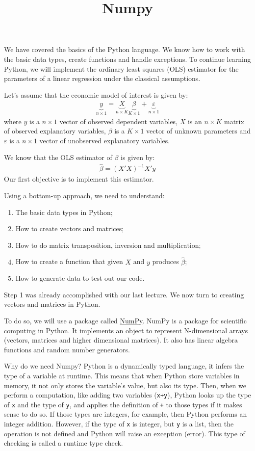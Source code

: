 \documentclass[12pt, a4paper]{article}
\date{}
\title{Numpy}
\begin{document}
\maketitle
We have covered the basics of the Python language.
We know how to work with the basic data types, create functions and handle exceptions.
To continue learning Python, we will implement the ordinary least squares (OLS) estimator for the parameters of a linear regression under the classical assumptions.

Let's assume that the economic model of interest is given by:
\begin{align*}
\underbrace{y}_{n \times 1}=\underbrace{X}_{n\times K}\underbrace{\beta}_{K\times 1} + \underbrace{\varepsilon}_{n\times 1}
\end{align*}
where \(y\) is a \(n\times 1\) vector of observed dependent variables, \(X\) is an \(n \times K\) matrix of observed explanatory variables, \(\beta\) is a \(K\times 1\) vector of unknown parameters and \(\varepsilon\) is a \(n\times 1\) vector of unobserved explanatory variables.

We know that the OLS estimator of \(\beta\) is given by:
\begin{align*}
\hat{\beta}=(X'X)^{-1}X'y
\end{align*}
Our first objective is to implement this estimator.

Using a bottom-up approach, we need to understand:
\begin{enumerate}
\item The basic data types in Python;
\item How to create vectors and matrices;
\item How to do matrix transposition, inversion and multiplication;
\item How to create a function that given \(X\) and \(y\) produces \(\hat{\beta}\);
\item How to generate data to test out our code.
\end{enumerate}
Step 1 was already accomplished with our last lecture.
We now turn to creating vectors and matrices in Python.

To do so, we will use a package called \href{https://docs.scipy.org/doc/numpy/index.html}{NumPy}.
NumPy is a package for scientific computing in Python.
It implements an object to represent N-dimensional arrays (vectors, matrices and higher dimensional matrices).
It also has linear algebra functions and random number generators.

Why do we need Numpy?
Python is a dynamically typed language, it infers the type of a variable at runtime.
This means that when Python store variables in memory, it not only stores the variable's value, but also its type.
Then, when we perform a computation, like adding two variables (\texttt{x+y}), Python looks up the type of \texttt{x} and the type of \texttt{y}, and applies the definition of \texttt{+} to those types if it makes sense to do so. If those types are integers, for example, then Python performs an integer addition.
However, if the type of \texttt{x} is integer, but \texttt{y} is a list, then the operation is not defined and Python will raise an exception (error).
This type of checking is called a runtime type check.
\end{document}
